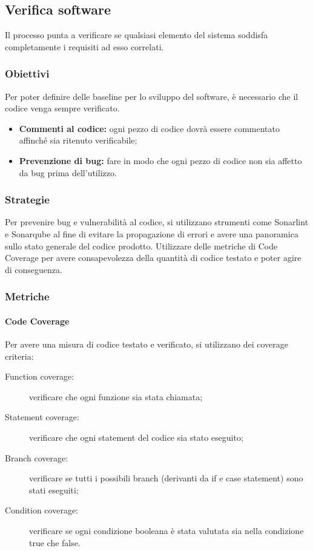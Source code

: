 \documentclass[PianoDiQualifica.tex]{subfiles}
\begin{document}
\subsection{Verifica software}
Il processo punta a verificare se qualsiasi elemento del sistema soddisfa completamente i requisiti ad esso correlati.
\subsubsection{Obiettivi}
Per poter definire delle baseline per lo sviluppo del software, è necessario che il codice venga sempre verificato.
 \begin{itemize}
 	\item \textbf{Commenti al codice:} ogni pezzo di codice dovrà essere commentato affinché sia ritenuto verificabile;
 	\item \textbf{Prevenzione di bug:} fare in modo che ogni pezzo di codice non sia affetto da bug prima dell'utilizzo.
 \end{itemize}
\subsubsection{Strategie}
Per prevenire bug e vulnerabilità al codice, si utilizzano strumenti come Sonarlint e Sonarqube al fine di evitare la propagazione di errori e avere una panoramica sullo stato generale del codice prodotto.
Utilizzare delle metriche di Code Coverage per avere consapevolezza della quantità di codice testato e poter agire di conseguenza.
 
\subsubsection{Metriche}
\paragraph{Code Coverage}
Per avere una misura di codice testato e verificato, si utilizzano dei coverage criteria:
\begin{description}
	\item [Function coverage:] verificare che ogni funzione sia stata chiamata;
	\item [Statement coverage:] verificare che ogni statement del codice sia stato eseguito; 
	\item [Branch coverage:] verificare se tutti i possibili branch (derivanti da if e case statement) sono stati eseguiti;
	\item [Condition coverage:] verificare se ogni condizione booleana è stata valutata sia nella condizione true che false. 
\end{description}
\end{document}
